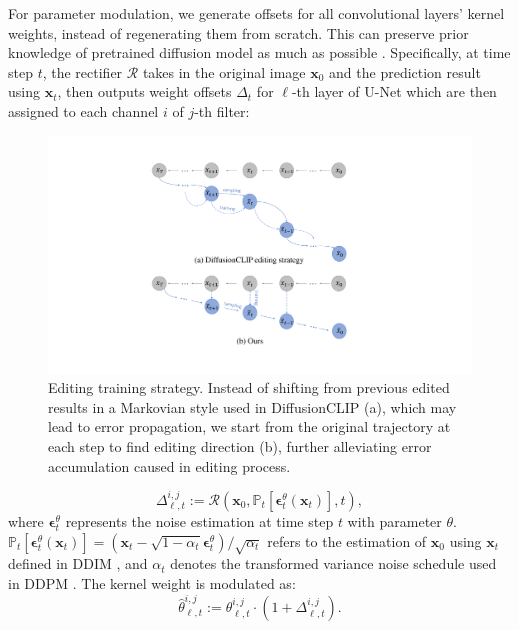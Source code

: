 \documentclass[letterpaper]{article} %
\begin{document}
For parameter modulation, we generate offsets for all convolutional layers' kernel weights, instead of regenerating them from scratch. This can preserve prior knowledge of pretrained diffusion model as much as possible \cite{alaluf2022hyperstyle}. Specifically, at time step $t$, the rectifier $\bm{\mathcal{R}}$ takes in the original image $\bm{x}_{0}$ and the prediction result using $\bm{x}_{t}$, then outputs weight offsets $\Delta_{t}$ for $\ell$-th layer of U-Net which are then assigned to each channel $i$ of $j$-th filter:
\begin{figure}[t]
    \centering
    \includegraphics[width=1\columnwidth]{Figs/fig3.pdf}
    \caption{Editing training strategy. Instead of shifting from previous edited results in a Markovian style used in DiffusionCLIP (a), which may lead to error propagation, we start from the original trajectory at each step to find editing direction (b), further alleviating error accumulation caused in editing process.}
    \label{fig3}
\end{figure}

\begin{equation}
    \Delta_{\ell,t}^{i,j} := \bm{\mathcal{R}}(\bm{x}_{0}, \mathbb{P}_t[\bm{\epsilon}_t^\theta(\bm{x}_t)], t),
\end{equation}
where $\bm{\epsilon}_t^\theta$ represents the noise estimation at time step $t$ with parameter $\theta$. $\mathbb{P}_t[\bm{\epsilon}_t^\theta(\bm{x}_t)]=(\bm{x}_t-\sqrt{1-\alpha_t}\bm{\epsilon}_t^\theta)/\sqrt{\alpha_t}$ refers to the estimation of $\bm{x}_0$ using $\bm{x}_t$ defined in DDIM \cite{song2020denoising}, and $\alpha_t$ denotes the transformed variance noise schedule used in DDPM \cite{ho2020denoising}.
The kernel weight is modulated as:
\begin{equation}
    \hat{\theta}_{\ell,t}^{i,j} := \theta_{\ell,t}^{i,j} \cdot (1+\Delta_{\ell,t}^{i,j}).
\end{equation}
\end{document}
